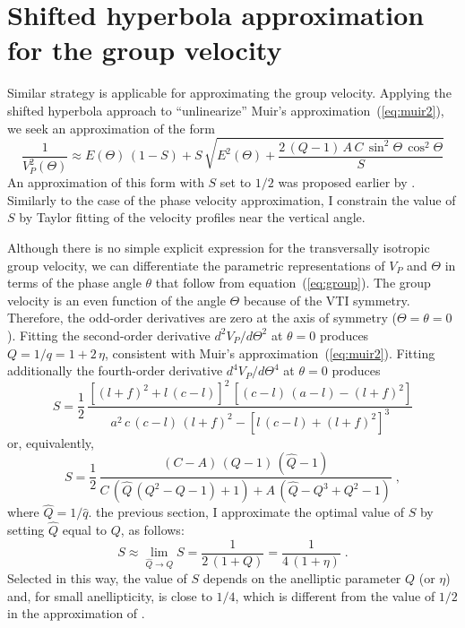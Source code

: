 
\section{Shifted hyperbola approximation for the group velocity}

Similar strategy is applicable for approximating the group velocity. Applying
the shifted hyperbola approach to ``unlinearize'' Muir's
approximation~(\ref{eq:muir2}), we seek an approximation of the form
\begin{equation}
  \label{eq:shiftM}
  \frac{1}{V_P^2(\Theta)} \approx E(\Theta)\,(1-S) + S\,\sqrt{E^2(\Theta) + 
    \frac{2\,(Q-1)\,A\,C\,
      \sin^2{\Theta}\,\cos^2{\Theta}}{S}}
\end{equation}
An approximation of this form with $S$ set to $1/2$ was proposed earlier by
\cite{SEG-2001-01060109}. Similarly to the case of the phase velocity
approximation, I constrain the value of $S$ by Taylor fitting of the velocity
profiles near the vertical angle.

Although there is no simple explicit expression for the transversally
isotropic group velocity, we can differentiate the parametric representations
of $V_P$ and $\Theta$ in terms of the phase angle $\theta$ that follow from
equation~(\ref{eq:group}). The group velocity is an even function of the angle
$\Theta$ because of the VTI symmetry. Therefore, the odd-order derivatives are
zero at the axis of symmetry ($\Theta=\theta=0$). Fitting the second-order
derivative $d^2 V_P/d\Theta^2$ at $\theta=0$ produces $Q=1/q=1+2\,\eta$,
consistent with Muir's approximation~(\ref{eq:muir2}). Fitting additionally
the fourth-order derivative $d^4 V_P/d\Theta^4$ at $\theta=0$ produces
\begin{equation}
  \label{eq:Sval}
  S = \frac{1}{2}\,\frac{
    \left[(l+f)^2 + l\,(c-l)\right]^2\,\left[(c-l)\,(a-l) - (l+f)^2\right]}{
    a^2\,c\,(c-l)\,(l+f)^2 - \left[l\,(c-l) + (l+f)^2\right]^3}
\end{equation}
or, equivalently,
\begin{equation}
  \label{eq:Sval2}
  S = \frac{1}{2}\,\frac{(C-A)\,(Q-1)\,(\hat{Q}-1)}
  {C\,\left(\hat{Q}\,(Q^2-Q-1) + 1\right) + 
    A\,\left(\hat{Q}-Q^3+Q^2-1\right)}\;,
\end{equation}
where $\hat{Q}=1/\hat{q}$.  the
previous section, I approximate the optimal value of $S$ by setting $\hat{Q}$
equal to $Q$, as follows:
\begin{equation}
  \label{eq:Sappr}
  S \approx \lim_{\hat{Q} \rightarrow Q} S = \frac{1}{2\,(1+Q)} = 
  \frac{1}{4\,(1 + \eta)}\;.
\end{equation}
Selected in this way, the value of $S$ depends on the anelliptic parameter $Q$
(or $\eta$) and, for small anellipticity, is close to $1/4$, which is
different from the value of $1/2$ in the approximation of
\cite{SEG-2001-01060109}.

